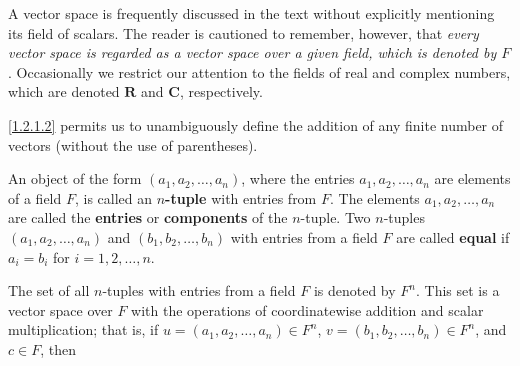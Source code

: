 \begin{note}
    A vector space is frequently discussed in the text without explicitly mentioning its field of scalars.
    The reader is cautioned to remember, however, that \emph{every vector space is regarded as a vector space over a given field, which is denoted by \(F\)}.
    Occasionally we restrict our attention to the fields of real and complex numbers, which are denoted \(\mathbf{R}\) and \(\mathbf{C}\), respectively.
\end{note}

\begin{note}
    \ref{1.2.1.2} permits us to unambiguously define the addition of any finite number of vectors
    (without the use of parentheses).
\end{note}

\begin{definition}\label{def:1.2.3}
    An object of the form \((a_1, a_2, \dots, a_n)\), where the entries \(a_1, a_2, \dots, a_n\) are elements of a field \(F\), is called an \textbf{\(n\)-tuple} with entries from \(F\).
    The elements \(a_1, a_2, \dots, a_n\) are called the \textbf{entries} or \textbf{components} of the \(n\)-tuple.
    Two \(n\)-tuples \((a_1, a_2, \dots, a_n)\) and \((b_1, b_2, \dots, b_n)\) with entries from a field \(F\) are called \textbf{equal} if \(a_i = b_i\) for \(i = 1, 2, \dots, n\).
\end{definition}

\begin{example}\label{eg:1.2.1}
    The set of all \(n\)-tuples with entries from a field \(F\) is denoted by \(F^n\).
    This set is a vector space over \(F\) with the operations of coordinatewise addition and scalar multiplication;
    that is, if \(u = (a_1, a_2, \dots, a_n) \in F^n\), \(v = (b_1, b_2, \dots, b_n) \in F^n\), and \(c \in F\), then
\end{example}

